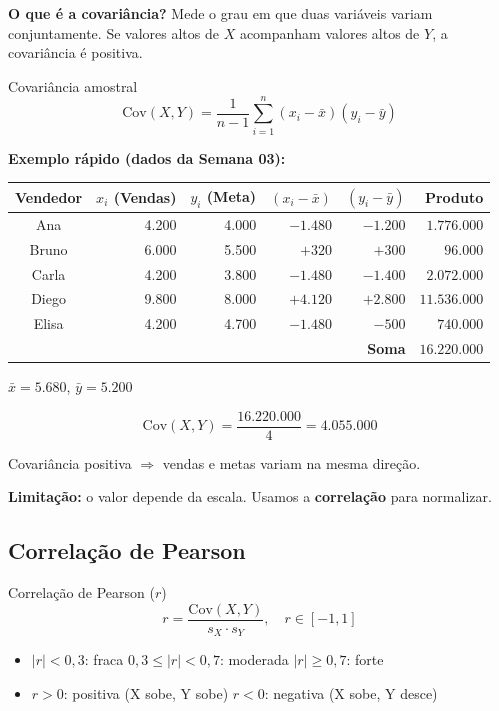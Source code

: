 \begin{SolvedBox}
\textbf{O que é a covariância?} Mede o grau em que duas variáveis variam
conjuntamente. Se valores altos de $X$ acompanham valores altos de $Y$,
a covariância é positiva.

\begin{FormulaBox}{Covariância amostral}
\[
\mathrm{Cov}(X,Y) = \frac{1}{n-1}\sum_{i=1}^{n}(x_i - \bar{x})(y_i - \bar{y})
\]
\end{FormulaBox}

\textbf{Exemplo rápido (dados da Semana 03):}

\begin{center}
\begin{tabular}{|c|r|r|r|r|r|}
\hline
Vendedor & $x_i$ (Vendas) & $y_i$ (Meta) & $(x_i-\bar{x})$ & $(y_i-\bar{y})$ & Produto \\
\hline
Ana   & 4.200 & 4.000 & $-1.480$ & $-1.200$ & $1.776.000$ \\
Bruno & 6.000 & 5.500 & $+320$   & $+300$   & $96.000$    \\
Carla & 4.200 & 3.800 & $-1.480$ & $-1.400$ & $2.072.000$ \\
Diego & 9.800 & 8.000 & $+4.120$ & $+2.800$ & $11.536.000$ \\
Elisa & 4.200 & 4.700 & $-1.480$ & $-500$   & $740.000$   \\
\hline
\multicolumn{5}{|r|}{\textbf{Soma}} & $\mathbf{16.220.000}$ \\
\hline
\end{tabular}
\end{center}

$\bar{x} = 5.680$, $\bar{y} = 5.200$

\[
\mathrm{Cov}(X,Y) = \frac{16.220.000}{4} = 4.055.000
\]

Covariância positiva $\Rightarrow$ vendas e metas variam na mesma direção.

\textbf{Limitação:} o valor depende da escala. Usamos a \textbf{correlação} para normalizar.
\end{SolvedBox}

\subsection{Correlação de Pearson}

\begin{FormulaBox}{Correlação de Pearson ($r$)}
\[
r = \frac{\mathrm{Cov}(X,Y)}{s_X \cdot s_Y}, \quad r \in [-1, 1]
\]
\begin{itemize}
  \item $|r| < 0{,}3$: fraca \quad $0{,}3 \leq |r| < 0{,}7$: moderada \quad $|r| \geq 0{,}7$: forte
  \item $r > 0$: positiva (X sobe, Y sobe) \quad $r < 0$: negativa (X sobe, Y desce)
\end{itemize}
\end{FormulaBox}

